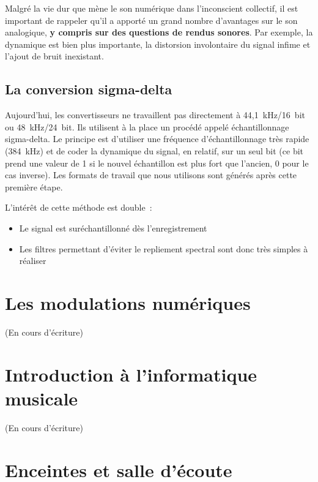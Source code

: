 \documentclass[
]{book}
\providecommand{\tightlist}{%
  \setlength{\itemsep}{0pt}\setlength{\parskip}{0pt}}
\begin{document}
Malgré la vie dur que mène le son numérique dans l'inconscient collectif, il est important de rappeler qu'il a apporté un grand nombre d'avantages sur le son analogique, \textbf{y compris sur des questions de rendus sonores}. Par exemple, la dynamique est bien plus importante, la distorsion involontaire du signal infime et l'ajout de bruit inexistant.

\hypertarget{la-conversion-sigma-delta}{%
\section{La conversion sigma-delta}\label{la-conversion-sigma-delta}}

Aujourd'hui, les convertisseurs ne travaillent pas directement à 44,1~kHz/16~bit ou 48~kHz/24~bit. Ils utilisent à la place un procédé appelé échantillonnage sigma-delta. Le principe est d'utiliser une fréquence d'échantillonnage très rapide (384~kHz) et de coder la dynamique du signal, en relatif, sur un seul bit (ce bit prend une valeur de 1 si le nouvel échantillon est plus fort que l'ancien, 0 pour le cas inverse). Les formats de travail que nous utilisons sont générés après cette première étape.

L'intérêt de cette méthode est double~:

\begin{itemize}
\tightlist
\item
  Le signal est suréchantillonné dès l'enregistrement
\item
  Les filtres permettant d'éviter le repliement spectral sont donc très simples à réaliser
\end{itemize}

\hypertarget{les-modulations-numuxe9riques}{%
\chapter{Les modulations numériques}\label{les-modulations-numuxe9riques}}

(En cours d'écriture)

\hypertarget{introduction-uxe0-linformatique-musicale}{%
\chapter{Introduction à l'informatique musicale}\label{introduction-uxe0-linformatique-musicale}}

(En cours d'écriture)

\hypertarget{enceintes-et-salle-duxe9coute}{%
\chapter{Enceintes et salle d'écoute}\label{enceintes-et-salle-duxe9coute}}
\end{document}
